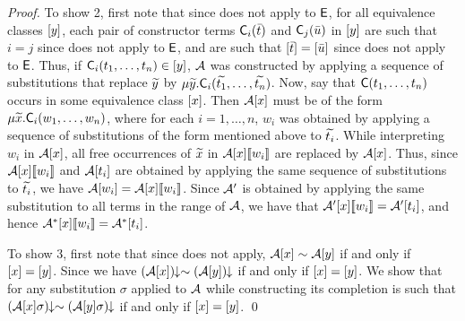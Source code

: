 \begin{proof}
To show 2, 
first note that since  does not apply to $\mathsf{E}$,
for all equivalence classes $[y]$,
each pair of constructor terms $\textsf{C}_i( \bar t )$ and $\textsf{C}_j( \bar u )$ in $[y]$
are such that $i = j$ since  does not apply to $\mathsf{E}$,
and are such that $[ \bar t ] = [ \bar u ]$ since  does not apply to $\mathsf{E}$.
Thus, 
if $\textsf{C}_i( t_1, \ldots, t_n ) \in [y]$,
$\mathcal{A}$ was constructed by applying a sequence of substitutions
that replace ${\widetilde{y}}$ by $\mu {\widetilde{y}}. \textsf{C}_i( {\widetilde{t_1}}, \ldots, {\widetilde{t_n}} )$.
Now, say that $\textsf{C}( t_1, \ldots, t_n )$ occurs in some equivalence class $[x]$.
Then $\mathcal{A} [x]$ must be of the form $\mu {\widetilde{x}}. \textsf{C}_i( w_1, \ldots, w_n )$,
where for each $i=1,\ldots,n$, $w_i$ was obtained by applying a sequence of substitutions
of the form mentioned above to ${\widetilde{t_i}}$.
While interpreting $w_i$ in $\mathcal{A} [x]$,
all free occurrences of ${\widetilde{x}}$ in $\mathcal{A} [x] [\![ w_i ]\!]$ are replaced by $\mathcal{A} [x]$. 
Thus, since $\mathcal{A} [x] [\![ w_i ]\!]$ and $\mathcal{A} [t_i]$ are obtained by applying the same sequence of substitutions to ${\widetilde{t_i}}$,
we have $\mathcal{A} [w_i] = \mathcal{A} [x] [\![  w_i  ]\!]$.
Since $\mathcal{A}'$ is obtained by applying the same substitution to all terms in the range of $\mathcal{A}$,
we have that $\mathcal{A}' [x] [\![ w_i ]\!] = \mathcal{A}' [t_i]$,
and hence $\mathcal{A}^\ast [x] [\![ w_i ]\!] = \mathcal{A}^\ast [t_i]$.

To show 3,
first note that since  does not apply,
$\mathcal{A} [x] \sim \mathcal{A} [y]$ if and only if $[x] = [y]$.
Since 
we have ${(\mathcal{A} [x])}\!\!\downarrow \sim {(\mathcal{A}[y])}\!\!\downarrow$ if and only if $[x] = [y]$.
We show that for any substitution $\sigma$ applied to $\mathcal{A}$ while constructing its completion is such that
${(\mathcal{A} [x] \sigma)}\!\!\downarrow \sim {(\mathcal{A}[y] \sigma)}\!\!\downarrow$ if and only if $[x] = [y]$.
\qed
\end{proof}

